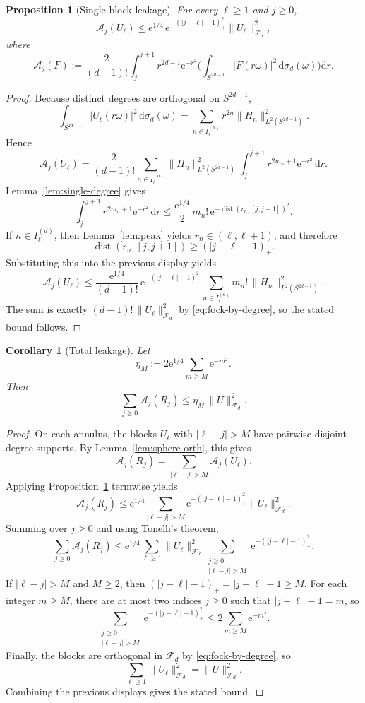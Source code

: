 \documentclass[11pt]{amsart}
\newtheorem{proposition}[theorem]{Proposition}
\newtheorem{corollary}[theorem]{Corollary}
\theoremstyle{remark}
\newcommand{\abs}[1]{\lvert #1 \rvert}
\newcommand{\norm}[1]{\lVert #1 \rVert}
\DeclareMathOperator{\dist}{dist}
\newcommand{\dd}{\mathrm{d}}
\newcommand{\ee}{\mathrm{e}}
\newcommand{\Fd}{\mathcal{F}_d}
\newcommand{\Sphere}{S^{2d-1}}
\newcommand{\Ann}[1]{\mathcal{A}_{#1}}
\begin{document}
\begin{proposition}[Single-block leakage]\label{prop:single-leak}
For every $\ell \ge 1$ and $j \ge 0$,
\[
\Ann{j}(U_\ell)
\le
\ee^{1/4}\,
\ee^{-(\abs{j-\ell}-1)_+^2}
\norm{U_\ell}_{\Fd}^2,
\]
where
\[
\Ann{j}(F)
:=
\frac{2}{(d-1)!}
\int_j^{j+1} r^{2d-1}\ee^{-r^2}
\biggl(
\int_{\Sphere} \abs{F(r\omega)}^2\,\dd \sigma_d(\omega)
\biggr)\dd r.
\]
\end{proposition}

\begin{proof}
Because distinct degrees are orthogonal on $\Sphere$,
\[
\int_{\Sphere}\abs{U_\ell(r\omega)}^2\,\dd \sigma_d(\omega)
=
\sum_{n \in I_\ell^{(d)}} r^{2n}\norm{H_n}_{L^2(\Sphere)}^2.
\]
Hence
\[
\Ann{j}(U_\ell)
=
\frac{2}{(d-1)!}
\sum_{n \in I_\ell^{(d)}} \norm{H_n}_{L^2(\Sphere)}^2
\int_j^{j+1} r^{2m_n+1}\ee^{-r^2}\,\dd r.
\]
Lemma~\ref{lem:single-degree} gives
\[
\int_j^{j+1} r^{2m_n+1}\ee^{-r^2}\,\dd r
\le
\frac{\ee^{1/4}}{2}\,m_n!\,
\ee^{-\dist(r_n,[j,j+1])^2}.
\]
If $n \in I_\ell^{(d)}$, then Lemma~\ref{lem:peak} yields
$r_n \in (\ell,\ell+1)$, and therefore
\[
\dist(r_n,[j,j+1]) \ge (\abs{j-\ell}-1)_+.
\]
Substituting this into the previous display yields
\[
\Ann{j}(U_\ell)
\le
\frac{\ee^{1/4}}{(d-1)!}\,
\ee^{-(\abs{j-\ell}-1)_+^2}
\sum_{n \in I_\ell^{(d)}} m_n!\,\norm{H_n}_{L^2(\Sphere)}^2.
\]
The sum is exactly $(d-1)!\,\norm{U_\ell}_{\Fd}^2$ by
\eqref{eq:fock-by-degree}, so the stated bound follows.
\end{proof}

\begin{corollary}[Total leakage]\label{cor:leakage}
Let
\[
\eta_M := 2\ee^{1/4}\sum_{m \ge M}\ee^{-m^2}.
\]
Then
\[
\sum_{j \ge 0} \Ann{j}(R_j)
\le
\eta_M\, \norm{U}_{\Fd}^2.
\]
\end{corollary}

\begin{proof}
On each annulus, the blocks $U_\ell$ with $\abs{\ell-j}>M$ have pairwise
disjoint degree supports.  By Lemma~\ref{lem:sphere-orth}, this gives
\[
\Ann{j}(R_j)
=
\sum_{\abs{\ell-j}>M} \Ann{j}(U_\ell).
\]
Applying Proposition~\ref{prop:single-leak} termwise yields
\[
\Ann{j}(R_j)
\le
\ee^{1/4}\sum_{\abs{\ell-j}>M}
\ee^{-(\abs{j-\ell}-1)_+^2}\norm{U_\ell}_{\Fd}^2.
\]
Summing over $j \ge 0$ and using Tonelli's theorem,
\[
\sum_{j \ge 0} \Ann{j}(R_j)
\le
\ee^{1/4}\sum_{\ell \ge 1}\norm{U_\ell}_{\Fd}^2
\sum_{\substack{j \ge 0\\ \abs{\ell-j}>M}}
\ee^{-(\abs{j-\ell}-1)_+^2}.
\]
If $\abs{\ell-j}>M$ and $M \ge 2$, then
$(\abs{j-\ell}-1)_+ = \abs{j-\ell}-1 \ge M$.  For each integer $m \ge M$,
there are at most two indices $j \ge 0$ such that $\abs{j-\ell}-1 = m$,
so
\[
\sum_{\substack{j \ge 0\\ \abs{\ell-j}>M}}
\ee^{-(\abs{j-\ell}-1)_+^2}
\le
2\sum_{m \ge M}\ee^{-m^2}.
\]
Finally, the blocks are orthogonal in $\Fd$ by \eqref{eq:fock-by-degree}, so
\[
\sum_{\ell \ge 1}\norm{U_\ell}_{\Fd}^2
=
\norm{U}_{\Fd}^2.
\]
Combining the previous displays gives the stated bound.
\end{proof}
\end{document}
